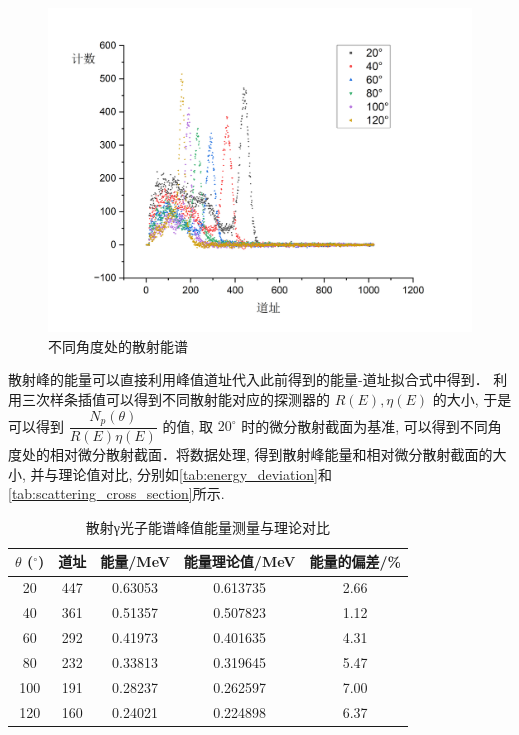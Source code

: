 \documentclass[font=default]{mpltx}
\begin{document}
      \begin{figure}[htbp]
        \centering
        \includegraphics[width=0.85\linewidth]{fig/jiaodu.png}
        \caption{不同角度处的散射能谱}
        \label{fig:jiaodu}
      \end{figure}
      散射峰的能量可以直接利用峰值道址代入此前得到的能量-道址拟合式中得到．
      利用三次样条插值可以得到不同散射能对应的探测器的 $R(E), \eta(E)$ 的大小, 
      于是可以得到 $\dfrac{N_p(\theta)}{R(E)\eta(E)}$ 的值, 取 $20^\circ$ 时的微分散射截面为基准,
      可以得到不同角度处的相对微分散射截面．将数据处理, 得到散射峰能量和相对微分散射截面的大小, 并与理论值对比, 
      分别如\autoref{tab:energy_deviation}和\autoref{tab:scattering_cross_section}所示. 

      \begin{table}[htbp]
        \centering
        \caption{散射γ光子能谱峰值能量测量与理论对比}
        \begin{tabular}{ccccc}
          \toprule
          $\theta$ ($^\circ$) & 道址 & 能量/MeV & 能量理论值/MeV & 能量的偏差/\% \\
          \midrule
          20 & 447 & 0.63053 & 0.613735 & 2.66 \\
          40 & 361 & 0.51357 & 0.507823 & 1.12 \\
          60 & 292 & 0.41973 & 0.401635 & 4.31 \\
          80 & 232 & 0.33813 & 0.319645 & 5.47 \\
          100 & 191 & 0.28237 & 0.262597 & 7.00 \\
          120 & 160 & 0.24021 & 0.224898 & 6.37 \\
          \bottomrule
        \end{tabular}
        \label{tab:energy_deviation}
      \end{table}
\end{document}
